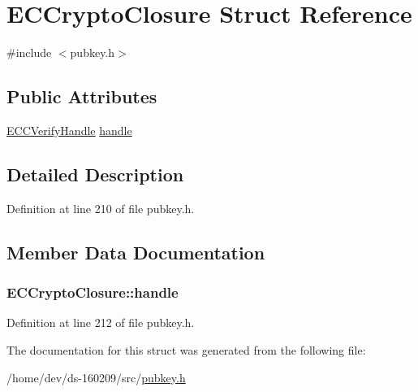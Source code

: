 \hypertarget{struct_e_c_crypto_closure}{}\section{E\+C\+Crypto\+Closure Struct Reference}
\label{struct_e_c_crypto_closure}


{\ttfamily \#include $<$pubkey.\+h$>$}

\subsection*{Public Attributes}
\begin{DoxyCompactItemize}
\item 
\hyperlink{class_e_c_c_verify_handle}{E\+C\+C\+Verify\+Handle} \hyperlink{struct_e_c_crypto_closure_a3c20e00d41d7dd286637034aae423611}{handle}
\end{DoxyCompactItemize}


\subsection{Detailed Description}


Definition at line 210 of file pubkey.\+h.



\subsection{Member Data Documentation}
\hypertarget{struct_e_c_crypto_closure_a3c20e00d41d7dd286637034aae423611}{}
\subsubsection[{handle}]{ E\+C\+Crypto\+Closure\+::handle}\label{struct_e_c_crypto_closure_a3c20e00d41d7dd286637034aae423611}


Definition at line 212 of file pubkey.\+h.



The documentation for this struct was generated from the following file\+:\begin{DoxyCompactItemize}
\item 
/home/dev/ds-\/160209/src/\hyperlink{pubkey_8h}{pubkey.\+h}\end{DoxyCompactItemize}

